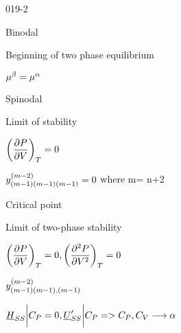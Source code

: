 \begin{mitframe}{019-2} 
   
    
\begin{listone}
    
    \item Binodal
    
    \begin{listtwo}
    
    	\item Beginning of two phase equilibrium
    
    	\item $\chempot^{\beta} =\chempot^{\tdiff}$

    \end{listtwo}
    
    \item Spinodal
    
    \begin{listtwo}

    	\item Limit of stability

      	\item $\bigg(\dfrac{\partial\p}{\partial\vol}\bigg)_{\Temp}=0$
        
        \item $y_{(\mass-1)(\mass-1)(\mass-1)}^{(\mass-2)}=0$  where m= n+2
       \end{listtwo}
    
    \item Critical point
    
    	\begin{listtwo}
    
    	\item Limit of two-phase stability

      	\item $\bigg(\dfrac{\partial\p}{\partial\vol}\bigg)_{\Temp}=0, \bigg(\dfrac{\partial^2\p}{\partial\vol^2}\bigg)_{\Temp}=0$
        
               
        \item $y^{(\mass-2)}_{(\mass-1)(\mass-1),(\mass-1)}$
         
            \item $\uline\enthalpy_{\entropy\entropy}\bigg|\cp=0,\uline\intenergy'_{\entropy\entropy}\bigg|\cp=>\cp,\cv\longrightarrow\tdiff $
        
    \end{listtwo}
           
    
\end{listone}

\end{mitframe}